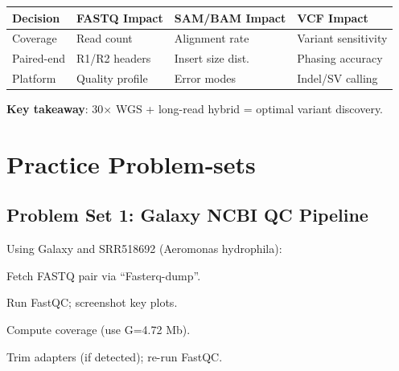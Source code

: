 \documentclass[
  letterpaper,
  DIV=11,
  numbers=noendperiod]{scrreprt}
\begin{document}
\begin{longtable}[]{@{}
  >{\raggedright\arraybackslash}p{}
  >{\raggedright\arraybackslash}p{}
  >{\raggedright\arraybackslash}p{}
  >{\raggedright\arraybackslash}p{}@{}}
\toprule\noalign{}
\begin{minipage}[b]{\linewidth}\raggedright
Decision
\end{minipage} & \begin{minipage}[b]{\linewidth}\raggedright
FASTQ Impact
\end{minipage} & \begin{minipage}[b]{\linewidth}\raggedright
SAM/BAM Impact
\end{minipage} & \begin{minipage}[b]{\linewidth}\raggedright
VCF Impact
\end{minipage} \\
\midrule\noalign{}
\endhead
\bottomrule\noalign{}
\endlastfoot
Coverage & Read count & Alignment rate & Variant sensitivity \\
Paired-end & R1/R2 headers & Insert size dist. & Phasing accuracy \\
Platform & Quality profile & Error modes & Indel/SV calling \\
\end{longtable}

\textbf{Key takeaway}: 30× WGS + long-read hybrid = optimal variant
discovery.

\section{Practice Problem‑sets}\label{practice-problemsets}

\subsection{Problem Set 1: Galaxy NCBI QC
Pipeline}\label{problem-set-1-galaxy-ncbi-qc-pipeline}

Using Galaxy and SRR518692 (Aeromonas hydrophila):\hspace{0pt}

Fetch FASTQ pair via ``Fasterq-dump''.

Run FastQC; screenshot key plots.

Compute coverage (use G=4.72 Mb).

Trim adapters (if detected); re-run FastQC.
\end{document}
